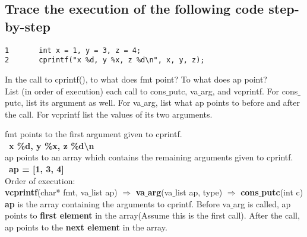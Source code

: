 \documentclass[a4paper]{article}
\begin{document}
	\subsection{ Trace the execution of the following code step-by-step}
	\begin{minipage}{0.4\textwidth}
\begin{lstlisting}
1	 	int x = 1, y = 3, z = 4;
2		cprintf("x %d, y %x, z %d\n", x, y, z);				
\end{lstlisting}	
\textbullet \quad In the call to cprintf(), to what does fmt point? To what does ap point? \\
\textbullet \quad List (in order of execution) each call to cons$\_$putc, va$\_$arg, and vcprintf. For cons$\_$putc, list its argument as well. For va$\_$arg, list what ap points to before and after the call. For vcprintf list the values of its two arguments.
		 \end{minipage}
		 \vrule
		 \raggedright
		 \begin{minipage}{0.1\textwidth}
		 	\phantom{A}
		 \end{minipage}
		 \begin{minipage}{0.5\textwidth}
			fmt points to the first argument given to cprintf. \\ \phantom{A} ~\textbf{x \%d, y \%x, z \%d\textbackslash n}\\
			ap points to an array which contains the remaining arguments given to cprintf. \\ \phantom{A} ~\textbf{ap = [1, 3, 4]} \\
			Order of execution: \\
			\textbf{vcprintf}(char* fmt, va$\_$list ap) $\Rightarrow$ \textbf{va$\_$arg}(va$\_$list ap, type) $\Rightarrow$ \textbf{cons$\_$putc}(int c) \\
			\textbf{ap} is the array containing the arguments to cprintf. Before va$\_$arg is called, ap points to \textbf{first element} in the array(Assume this is the first call). After the call, ap points to the \textbf{next element} in the array.
		 \end{minipage}
\end{document}
